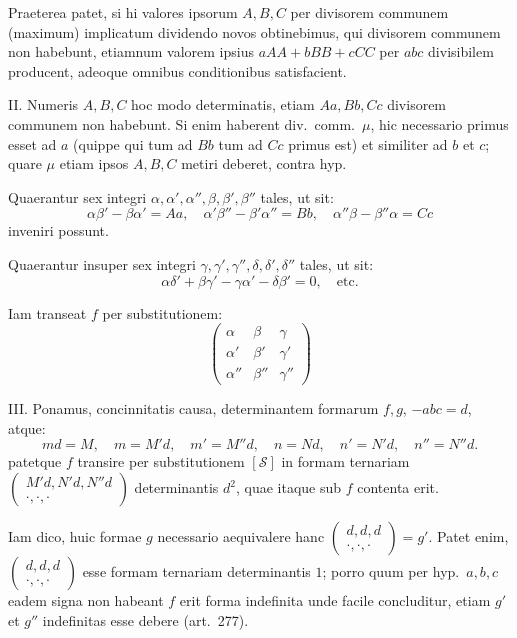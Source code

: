\documentclass[12pt,a4paper]{article}
\theoremstyle{plain}
\theoremstyle{definition}
\theoremstyle{remark}
\begin{document}
Praeterea patet, si hi valores ipsorum $A, B, C$ per divisorem communem
(maximum) implicatum dividendo novos obtinebimus, qui divisorem communem
non habebunt, etiamnum valorem ipsius $aAA + bBB + cCC$ per $abc$ divisibilem
producent, adeoque omnibus conditionibus satisfacient.

\textsc{II.} Numeris $A, B, C$ hoc modo determinatis, etiam $Aa, Bb, Cc$
divisorem communem non habebunt. Si enim haberent div.\ comm.\ $\mu$, hic
necessario primus esset ad $a$ (quippe qui tum ad $Bb$ tum ad $Cc$ primus est)
et similiter ad $b$ et $c$; quare $\mu$ etiam ipsos $A, B, C$ metiri deberet, contra hyp.

Quaerantur sex integri $\alpha, \alpha', \alpha'', \beta, \beta', \beta''$ tales, ut sit:
\[
\alpha\beta' - \beta\alpha' = Aa, \quad \alpha'\beta'' - \beta'\alpha'' = Bb, \quad
\alpha''\beta - \beta''\alpha = Cc
\]
inveniri possunt.

Quaerantur insuper sex integri $\gamma, \gamma', \gamma'', \delta, \delta', \delta''$ tales, ut sit:
\[
\alpha\delta' + \beta\gamma' - \gamma\alpha' - \delta\beta' = 0, \quad\text{etc.}
\]

Iam transeat $f$ per substitutionem:
\[
\begin{pmatrix}
\alpha & \beta & \gamma \\
\alpha' & \beta' & \gamma' \\
\alpha'' & \beta'' & \gamma''
\end{pmatrix}
\]

\textsc{III.} Ponamus, concinnitatis causa, determinantem formarum $f, g$,
$-abc = d$, atque:
\[
md = M, \quad m = M'd, \quad m' = M''d, \quad n = Nd, \quad n' = N'd, \quad n'' = N''d.
\]
patetque $f$ transire per substitutionem $[\mathcal{S}]$ in formam ternariam
$\begin{pmatrix} M'd, N'd, N''d \\ \cdot, \cdot, \cdot \end{pmatrix}$ determinantis $d^2$, quae itaque sub $f$
contenta erit.

Iam dico, huic formae $g$ necessario aequivalere hanc
$\begin{pmatrix} d, d, d \\ \cdot, \cdot, \cdot \end{pmatrix} = g'$.
Patet enim, $\begin{pmatrix} d, d, d \\ \cdot, \cdot, \cdot \end{pmatrix}$ esse formam ternariam determinantis $1$; porro
quum per hyp.\ $a, b, c$ eadem signa non habeant $f$ erit forma indefinita unde
facile concluditur, etiam $g'$ et $g''$ indefinitas esse debere (art.\@~277).
\end{document}
